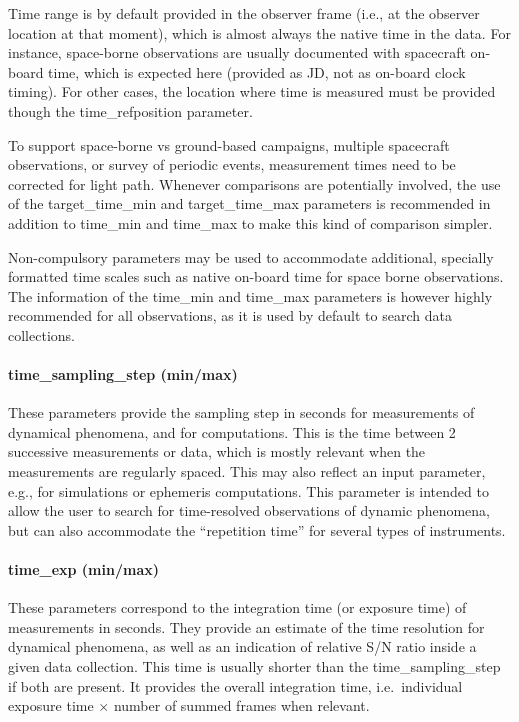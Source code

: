\documentclass[11pt,a4paper]{ivoa}
\begin{document}
Time range is by default provided in the observer frame (i.e., at the
observer location at that moment), which is almost always the native time
in the data. For instance, space-borne observations are usually documented
with spacecraft on-board time, which is expected here (provided as JD,
not as on-board clock timing). For other cases, the location where time
is measured must be provided though the time\_refposition parameter.

To support space-borne vs ground-based campaigns, multiple spacecraft
observations, or survey of periodic events, measurement times need to be
corrected for light path. Whenever comparisons are potentially involved,
the use of the target\_time\_min and target\_time\_max parameters is
recommended in addition to time\_min and time\_max to make this kind of
comparison simpler.

Non-compulsory parameters may be used to accommodate additional,
specially formatted time scales such as native on-board time for space
borne observations. The information of the time\_min and time\_max
parameters is however highly recommended for all observations,
as it is used by default to search data collections.

\paragraph{time\_sampling\_step (min/max)}

These parameters provide the sampling step in seconds for measurements
of dynamical phenomena, and for computations. This is the time between
2 successive measurements or data, which is mostly relevant when the
measurements are regularly spaced. This may also reflect an input
parameter, e.g., for simulations or ephemeris computations. This
parameter is intended to allow the user to search for time-resolved
observations of dynamic phenomena, but can also accommodate the
``repetition time'' for several types of instruments.

\paragraph{time\_exp (min/max)}

These parameters correspond to the integration time (or exposure
time) of measurements in seconds. They provide an estimate of the time
resolution for dynamical phenomena, as well as an indication of relative
S/N ratio inside a given data collection. This time is usually shorter than
the time\_sampling\_step if both are present. It provides the overall
integration time, i.e.\ individual exposure time $\times$ number of summed
frames when relevant.
\end{document}
